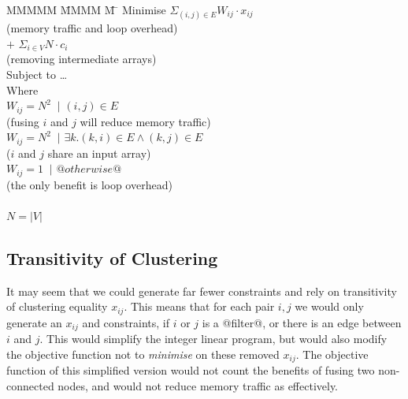 \begin{tabbing}
MMMMM   \= MMMM \= M \= \kill
Minimise   \>     \> $\Sigma_{(i,j) \in E} W_{ij} \cdot x_{ij}$   \\
           \> \> \> (memory traffic and loop overhead)         \\
           \> $+$ \> $\Sigma_{i \in V} N \cdot c_i$  \\
           \> \> \> (removing intermediate arrays)         \\
Subject to \> \ldots                                \\
Where      \>                                       \\
           \> $W_{ij} = N^2$ \> $~|$ \> $(i,j) \in E $         \\
           \> \> \> (fusing $i$ and $j$ will reduce memory traffic)         \\
           \> $W_{ij} = N^2$ \> $~|$ \> $\exists k. (k,i) \in E \wedge (k,j) \in E $     \\
           \> \> \> ($i$ and $j$ share an input array)                                         \\
           \> $W_{ij} = 1$   \> $~|$ \> $@otherwise@$                                                  \\
           \> \> \> (the only benefit is loop overhead)                                        \\
           \\
           \> $N = |V|$
\end{tabbing}


\subsection{Transitivity of Clustering}
It may seem that we could generate far fewer constraints and rely on transitivity of clustering equality $x_{ij}$.
This means that for each pair $i,j$ we would only generate an $x_{ij}$ and constraints, if $i$ or $j$ is a @filter@, or there is an edge between $i$ and $j$.
This would simplify the integer linear program, but would also modify the objective function not to \emph{minimise} on these removed $x_{ij}$.
The objective function of this simplified version would not count the benefits of fusing two non-connected nodes, and would not reduce memory traffic as effectively.


